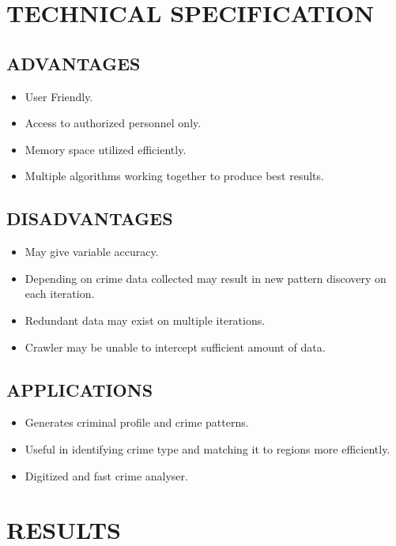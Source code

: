 \documentclass[12pt]{extreport}
\begin{document}
\chapter{TECHNICAL SPECIFICATION}

\section{ADVANTAGES}
\begin{itemize}
\item User Friendly.
\item Access to authorized personnel only.
\item Memory space utilized efficiently.
\item Multiple algorithms working together to produce best results.

\end{itemize}
 \section{DISADVANTAGES}
\begin{itemize}
 \item May give variable accuracy.
 \item Depending on crime data collected may result in new pattern discovery on each iteration.
 \item Redundant data may exist on multiple iterations.
 \item Crawler may be unable to intercept sufficient amount of data.
\end{itemize} 
 \section{APPLICATIONS}
\begin{itemize}
\item Generates criminal profile and crime patterns.
\item Useful in identifying crime type and matching it to regions more efficiently.
\item Digitized and fast crime analyser.
\end{itemize}

\chapter{RESULTS}
\end{document}
